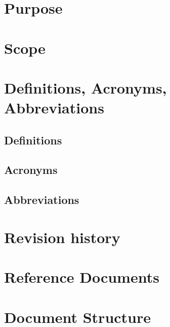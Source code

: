     \section{Purpose}  
    
    \section{Scope}
    
    \section{Definitions, Acronyms, Abbreviations}
        \subsection{Definitions}
        
        \subsection{Acronyms}
    
        \subsection{Abbreviations}
        
    \section{Revision history}
    \section{Reference Documents}
    \section{Document Structure}